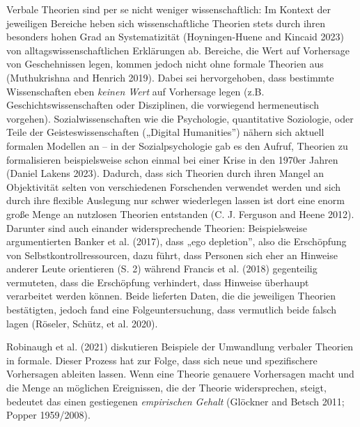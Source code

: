 \documentclass[
  letterpaper,
  DIV=11,
  numbers=noendperiod]{scrreprt}
\begin{document}
Verbale Theorien sind per se nicht weniger wissenschaftlich: Im Kontext
der jeweiligen Bereiche heben sich wissenschaftliche Theorien stets
durch ihren besonders hohen Grad an Systematizität (Hoyningen-Huene and
Kincaid 2023) von alltagswissenschaftlichen Erklärungen ab. Bereiche,
die Wert auf Vorhersage von Geschehnissen legen, kommen jedoch nicht
ohne formale Theorien aus (Muthukrishna and Henrich 2019). Dabei sei
hervorgehoben, dass bestimmte Wissenschaften eben \emph{keinen Wert} auf
Vorhersage legen (z.B. Geschichtswissenschaften oder Disziplinen, die
vorwiegend hermeneutisch vorgehen). Sozialwissenschaften wie die
Psychologie, quantitative Soziologie, oder Teile der
Geisteswissenschaften („Digital Humanities'') nähern sich aktuell
formalen Modellen an -- in der Sozialpsychologie gab es den Aufruf,
Theorien zu formalisieren beispielsweise schon einmal bei einer Krise in
den 1970er Jahren (Daniel Lakens 2023). Dadurch, dass sich Theorien
durch ihren Mangel an Objektivität selten von verschiedenen Forschenden
verwendet werden und sich durch ihre flexible Auslegung nur schwer
wiederlegen lassen ist dort eine enorm große Menge an nutzlosen Theorien
entstanden (C. J. Ferguson and Heene 2012). Darunter sind auch einander
widersprechende Theorien: Beispielsweise argumentierten Banker et al.
(2017), dass „ego depletion'', also die Erschöpfung von
Selbstkontrollressourcen, dazu führt, dass Personen sich eher an
Hinweise anderer Leute orientieren (S. 2) während Francis et al. (2018)
gegenteilig vermuteten, dass die Erschöpfung verhindert, dass Hinweise
überhaupt verarbeitet werden können. Beide lieferten Daten, die die
jeweiligen Theorien bestätigten, jedoch fand eine Folgeuntersuchung,
dass vermutlich beide falsch lagen (Röseler, Schütz, et al. 2020).

Robinaugh et al. (2021) diskutieren Beispiele der Umwandlung verbaler
Theorien in formale. Dieser Prozess hat zur Folge, dass sich neue und
spezifischere Vorhersagen ableiten lassen. Wenn eine Theorie genauere
Vorhersagen macht und die Menge an möglichen Ereignissen, die der
Theorie widersprechen, steigt, bedeutet das einen gestiegenen
\emph{empirischen Gehalt} (Glöckner and Betsch 2011; Popper 1959/2008).
\end{document}
